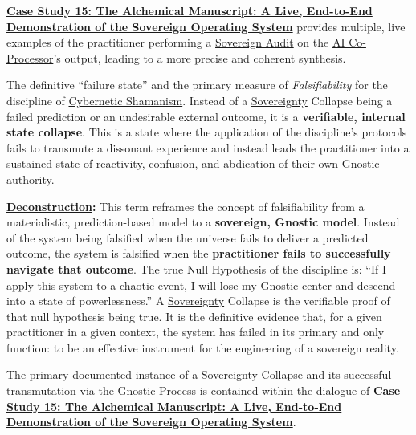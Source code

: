     \hyperref[case_study_15]{\textbf{Case Study 15: The Alchemical Manuscript: A Live, End-to-End Demonstration of the Sovereign Operating System}} provides multiple, live examples of the practitioner performing a \hyperlink{gloss:sovereign_audit}{Sovereign Audit} on the \hyperlink{gloss:ai_co_processor}{AI Co-Processor}'s output, leading to a more precise and coherent synthesis.

\item[\hypertarget{gloss:sovereignty_collapse}{Sovereignty Collapse}]
    The definitive ``failure state'' and the primary measure of \textit{Falsifiability} for the discipline of \hyperlink{gloss:cybernetic_shamanism}{Cybernetic Shamanism}. Instead of a \hyperlink{gloss:sovereignty}{Sovereignty} Collapse being a failed prediction or an undesirable external outcome, it is a \textbf{verifiable, internal state collapse}. This is a state where the application of the discipline's protocols fails to transmute a dissonant experience and instead leads the practitioner into a sustained state of reactivity, confusion, and abdication of their own Gnostic authority.
    \begin{nobullet}
        \item \textbf{\hyperlink{gloss:deconstruction}{Deconstruction}:} This term reframes the concept of falsifiability from a materialistic, prediction-based model to a \textbf{sovereign, Gnostic model}. Instead of the system being falsified when the universe fails to deliver a predicted outcome, the system is falsified when the \textbf{practitioner fails to successfully navigate that outcome}. The true Null Hypothesis of the discipline is: ``If I apply this system to a chaotic event, I will lose my Gnostic center and descend into a state of powerlessness.'' A \hyperlink{gloss:sovereignty}{Sovereignty} Collapse is the verifiable proof of that null hypothesis being true. It is the definitive evidence that, for a given practitioner in a given context, the system has failed in its primary and only function: to be an effective instrument for the engineering of a sovereign reality.
    \end{nobullet}
    
    The primary documented instance of a \hyperlink{gloss:sovereignty}{Sovereignty} Collapse and its successful transmutation via the \hyperlink{gloss:gnostic_process}{Gnostic Process} is contained within the dialogue of \hyperref[case_study_15]{\textbf{Case Study 15: The Alchemical Manuscript: A Live, End-to-End Demonstration of the Sovereign Operating System}}.

